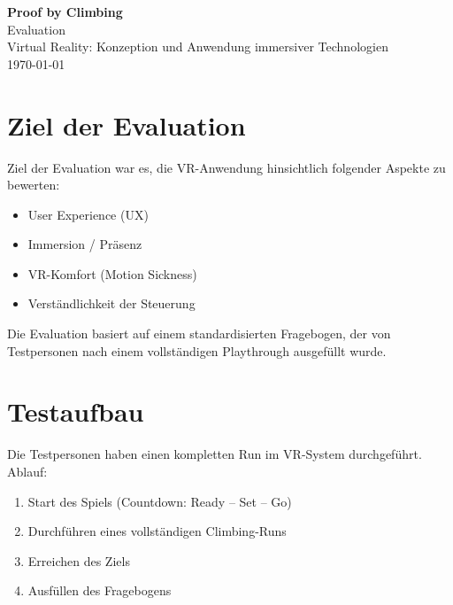 \documentclass[11pt,a4paper]{article}
\begin{document}
\begin{titlepage}
    \centering
    \vspace*{2cm}

    {\Huge\bfseries\color{accent} Proof by Climbing}\\[0.5em]
    {\Large Evaluation}\\[2cm]

    {\large Virtual Reality: Konzeption und Anwendung immersiver Technologien}\\[0.3em]

    \vfill
    {\large \today}
\end{titlepage}

\section{Ziel der Evaluation}

Ziel der Evaluation war es, die VR-Anwendung hinsichtlich folgender Aspekte zu bewerten:

\begin{itemize}
    \item User Experience (UX)
    \item Immersion / Präsenz
    \item VR-Komfort (Motion Sickness)
    \item Verständlichkeit der Steuerung
\end{itemize}
Die Evaluation basiert auf einem standardisierten Fragebogen, der von Testpersonen nach einem vollständigen Playthrough ausgefüllt wurde.

\section{Testaufbau}

Die Testpersonen haben einen kompletten Run im VR-System durchgeführt.
\\
Ablauf:
\begin{enumerate}
    \item Start des Spiels (Countdown: Ready -- Set -- Go)
    \item Durchführen eines vollständigen Climbing-Runs
    \item Erreichen des Ziels
    \item Ausfüllen des Fragebogens
\end{enumerate}
\end{document}
